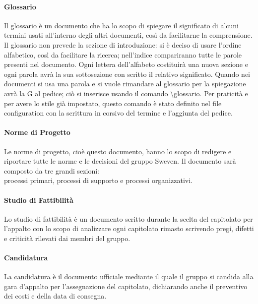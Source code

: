 \paragraph{Glossario}  \hfill \linebreak
Il glossario è un documento che ha lo scopo di spiegare il significato di alcuni termini usati 
all'interno degli altri documenti, così da facilitarne la comprensione. \newline
Il glossario non prevede la sezione di introduzione: si è deciso di usare l'ordine alfabetico, 
così da facilitare la ricerca; nell'indice compariranno tutte le parole presenti nel documento. 
Ogni lettera dell'alfabeto costituirà una nuova sezione e ogni parola avrà la sua sottosezione 
con scritto il relativo significato. \newline
Quando nei documenti si usa una parola e si vuole rimandare al glossario per la spiegazione 
avrà la G al pedice; ciò si inserisce usando il comando \textbackslash glossario. 
Per praticità e per avere lo stile già impostato, questo comando è stato definito nel file 
configuration con la scrittura in corsivo del termine e l'aggiunta del pedice.

\paragraph{Norme di Progetto}  \hfill \break
Le norme di progetto, cioè questo documento, hanno lo scopo di redigere e riportare tutte le norme 
e le decisioni del gruppo Sweven. Il documento sarà composto da tre grandi sezioni: \\
processi primari, processi di supporto e processi organizzativi.

\paragraph{Studio di Fattibilità} \hfill \break
Lo studio di fattibilità è un documento scritto durante la scelta del capitolato per l'appalto con 
lo scopo di analizzare ogni capitolato rimasto scrivendo pregi, difetti e criticità rilevati dai 
membri del gruppo.

\paragraph{Candidatura} \hfill \break
La candidatura è il documento ufficiale mediante il quale il gruppo si candida alla gara d'appalto 
per l'assegnazione del capitolato, dichiarando anche il preventivo dei costi e della data di consegna.

